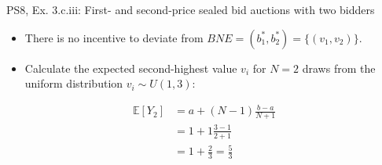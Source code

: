 \begin{frame}{PS8, Ex. 3.c.iii: First- and second-price sealed bid auctions with two bidders}
\begin{multicols}{2}
      \vspace{-18pt}
      \begin{itemize}
        \item[(ii)] There is no incentive to deviate from $BNE=(b_1^*,b_2^*)=\{(v_1,v_2)\}$.
        \item[(iii)] Calculate the expected second-highest value $v_i$ for $N=2$ draws from the uniform distribution $v_i\sim U(1,3)$:
      \end{itemize}
      \vspace{-8pt}
      \begin{align*}
        \mathbb{E}[Y_2]&=a+(N-1)\frac{b-a}{N+1}\\
                       &=1+1\frac{3-1}{2+1}\\
                       &=1+\frac{2}{3}=\frac{5}{3}
      \end{align*}
      \vfill\null
    \end{multicols}
\end{frame}
